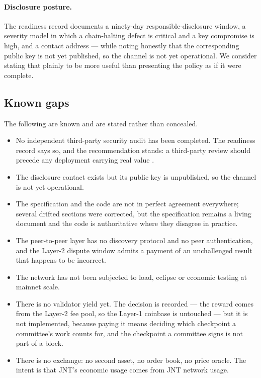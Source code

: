 \documentclass{article}
\begin{document}
\paragraph{Disclosure posture.} The readiness record documents a ninety-day
responsible-disclosure window, a severity model in which a chain-halting defect
is critical and a key compromise is high, and a contact address --- while
noting honestly that the corresponding public key is not yet published, so the
channel is not yet operational. We consider stating that plainly to be more
useful than presenting the policy as if it were complete.

\subsection{Known gaps}
\label{sec:gaps}

The following are known and are stated rather than concealed.

\begin{itemize}
\item No independent third-party security audit has been completed. The
readiness record says so, and the recommendation stands: a third-party review
should precede any deployment carrying real value \cite{jounit-readiness}.
\item The disclosure contact exists but its public key is unpublished, so the
channel is not yet operational.
\item The specification and the code are not in perfect agreement everywhere;
several drifted sections were corrected, but the specification remains a
living document and the code is authoritative where they disagree in
practice.
\item The peer-to-peer layer has no discovery protocol and no peer
authentication, and the Layer-2 dispute window admits a payment of an
unchallenged result that happens to be incorrect.
\item The network has not been subjected to load, eclipse or economic testing
at mainnet scale.
\item There is no validator yield yet. The decision is recorded --- the reward
comes from the Layer-2 fee pool, so the Layer-1 coinbase is untouched --- but
it is not implemented, because paying it means deciding which checkpoint a
committee's work counts for, and the checkpoint a committee signs is not part
of a block.
\item There is no exchange: no second asset, no order book, no price oracle.
The intent is that JNT's economic usage comes from JNT network usage.
\end{itemize}
\end{document}
